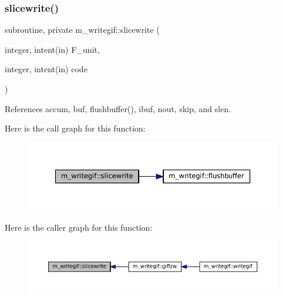 \subsubsection{\texorpdfstring{slicewrite()}{slicewrite()}}
{\footnotesize\ttfamily subroutine, private m\+\_\+writegif\+::slicewrite (\begin{DoxyParamCaption}\item[{integer, intent(in)}]{F\+\_\+unit,  }\item[{integer, intent(in)}]{code }\end{DoxyParamCaption})\hspace{0.3cm}{\ttfamily [private]}}



References accum, buf, flushbuffer(), ibuf, nout, skip, and slen.

Here is the call graph for this function\+:
\nopagebreak
\begin{figure}[H]
\begin{center}
\leavevmode
\includegraphics[width=350pt]{namespacem__writegif_a27e0ec2c6e05428641179bf35762adb7_cgraph}
\end{center}
\end{figure}
Here is the caller graph for this function\+:
\nopagebreak
\begin{figure}[H]
\begin{center}
\leavevmode
\includegraphics[width=350pt]{namespacem__writegif_a27e0ec2c6e05428641179bf35762adb7_icgraph}
\end{center}
\end{figure}
\mbox{\label{namespacem__writegif_a02be37849028b2f9484cff1b4285375d}} 
